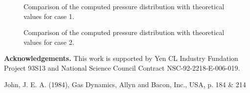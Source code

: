 \documentclass[10pt,twoside,twocolumn,letterpaper]{article}
\begin{document}
\begin{figure}[!ht] \columnwidth
{}
\caption{Comparison of the computed pressure distribution with theoretical values for case 1.}
\end{figure}

\begin{figure}[!ht] \columnwidth
{}
\caption{Comparison of the computed pressure distribution with theoretical values for case 2.}
\end{figure}

{\small {\bf Acknowledgements.} This work is supported by Yen CL Industry Fundation Project 93S13 and National Science Council Contract NSC-92-2218-E-006-019.}

\begin{thebibliography}{}
John, J. E. A. (1984), Gas Dynamics, Allyn and Bacon, Inc., USA, p. 184 \& 214 
\end{thebibliography}
\end{document}
